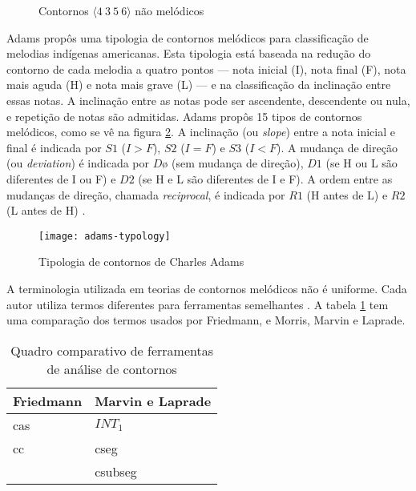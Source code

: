 \documentclass[12pt,brazil]{book}
\newcommand{\eng}[1]{\textit{#1}}
\newcommand{\contorno}[1]{$\langle #1 \rangle$}
\begin{document}
\begin{figure}
  \centering
  \qquad
  \qquad

  \caption{Contornos \contorno{4\:3\:5\:6} não melódicos}
  \label{fig:non-melodic-contours}
\end{figure}

Adams propôs uma tipologia de contornos melódicos para classificação
de melodias indígenas americanas. Esta tipologia está baseada na
redução do contorno de cada melodia a quatro pontos --- nota inicial
(I), nota final (F), nota mais aguda (H) e nota mais grave (L) --- e
na classificação da inclinação entre essas notas. A inclinação entre
as notas pode ser ascendente, descendente ou nula, e repetição de
notas são admitidas. Adams propôs 15 tipos de contornos melódicos,
como se vê na figura \ref{fig:adams-typology}. A inclinação (ou
\eng{slope}) entre a nota inicial e final é indicada por $S1$ ($I >
F$), $S2$ ($I = F$) e $S3$ ($I < F$). A mudança de direção (ou
\eng{deviation}) é indicada por $Dø$ (sem mudança de direção), $D1$
(se H ou L são diferentes de I ou F) e $D2$ (se H e L são diferentes
de I e F). A ordem entre as mudanças de direção, chamada
\eng{reciprocal}, é indicada por $R1$ (H antes de L) e $R2$ (L antes
de H) \cite{adams76:melodic}.

\begin{figure}
  \centering
  \texttt{[image: adams-typology]}
  \caption{Tipologia de contornos de Charles Adams
    \cite{adams76:melodic}}
  \label{fig:adams-typology}
\end{figure}

A terminologia utilizada em teorias de contornos melódicos não é
uniforme. Cada autor utiliza termos diferentes para ferramentas
semelhantes \cite{friedmann87:response}. A tabela
\ref{tab:compara-ferramentas} tem uma comparação dos termos usados por
Friedmann, e Morris, Marvin e Laprade.

\begin{table}
  \centering
  \begin{tabular}{l|l}
    Friedmann & Marvin e Laprade \\ \hline
    \gls{cas}  & $INT_1$ \\
    \gls{cc} & \gls{cseg} \\
     & \gls{csubseg}
  \end{tabular}
  \caption{Quadro comparativo de ferramentas de análise de contornos}
  \label{tab:compara-ferramentas}
\end{table}
\end{document}
